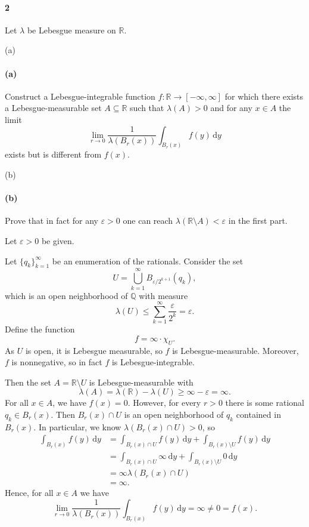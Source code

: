 \documentclass[12pt]{article}
\newlength{\myparskip}
\newenvironment{fullbox}{\begin{lrbox}{\savefullbox}\begin{minipage}{\dimexpr\textwidth-2\fboxsep\relax}\setlength{\parskip}{\myparskip}}{\end{minipage}\end{lrbox}\framebox[\textwidth]{\usebox{\savefullbox}}}
\newenvironment{pbox}[1][]{\begin{fullbox}\ifx#1\empty\else\paragraph{#1}\phantom{}\fi}{\end{fullbox}}
\theoremstyle{definition}
\newcommand{\Q}{\mathbb{Q}}
\newcommand{\R}{\mathbb{R}}
\newcommand{\eps}{\varepsilon}
\newcommand{\<}{\langle}
\renewcommand{\>}{\rangle}
\newcommand{\seq}{\subseteq}
\newcommand{\dd}{\,\mathrm{d}}
\begin{document}
\newpage
\begin{pbox}[2]
    Let $\lambda$ be Lebesgue measure on $\R$.
\end{pbox}

\begin{pbox}[(a)]
    Construct a Lebesgue-integrable function $f : \R \to [-\infty, \infty]$ for which there exists a Lebesgue-measurable set $A \seq \R$ such that $\lambda(A) > 0$ and for any $x \in A$ the limit
    \[
        \lim_{r \to 0} \frac{1}{\lambda(B_r(x))} \int_{B_r(x)} f(y) \dd{y} 
    \]
    exists but is different from $f(x)$.
\end{pbox}

\begin{pbox}[(b)]
    Prove that in fact for any $\eps > 0$ one can reach $\lambda(\R \setminus A) < \eps$ in the first part.
\end{pbox}

Let $\eps > 0$ be given.

Let $\{q_k\}_{k=1}^{\infty}$ be an enumeration of the rationals.
Consider the set
\[
    U = \bigcup_{k=1}^{\infty} B_{\eps/2^{k+1}}(q_k),
\]
which is an open neighborhood of $\Q$ with measure
\[
    \lambda(U) \leq \sum_{k=1}^{\infty} \frac{\eps}{2^k} = \eps.
\]
Define the function
\[
    f = \infty \cdot \chi_U.
\]
As $U$ is open, it is Lebesgue measurable, so $f$ is Lebesgue-measurable.
Moreover, $f$ is nonnegative, so in fact $f$ is Lebesgue-integrable.

Then the set $A = \R \setminus U$ is Lebesgue-measurable with
\[
    \lambda(A) = \lambda(\R) - \lambda(U) \geq \infty - \eps = \infty.
\]
For all $x \in A$, we have $f(x) = 0$.
However, for every $r > 0$ there is some rational $q_k \in B_r(x)$.
Then $B_r(x) \cap U$ is an open neighborhood of $q_k$ contained in $B_r(x)$.
In particular, we know $\lambda(B_r(x) \cap U) > 0$, so
\begin{align*}
    \int_{B_r(x)} f(y) \dd{y}
        &= \int_{B_r(x) \cap U} f(y) \dd{y} + \int_{B_r(x) \setminus U} f(y) \dd{y} \\
        &= \int_{B_r(x) \cap U} \infty \dd{y} + \int_{B_r(x) \setminus U} 0 \dd{y} \\
        &= \infty \lambda(B_r(x) \cap U) \\
        &= \infty.
\end{align*}
Hence, for all $x \in A$ we have
\[
    \lim_{r \to 0} \frac{1}{\lambda(B_r(x))} \int_{B_r(x)} f(y) \dd{y}
        = \infty
        \ne 0 
        = f(x).
\]
\end{document}
